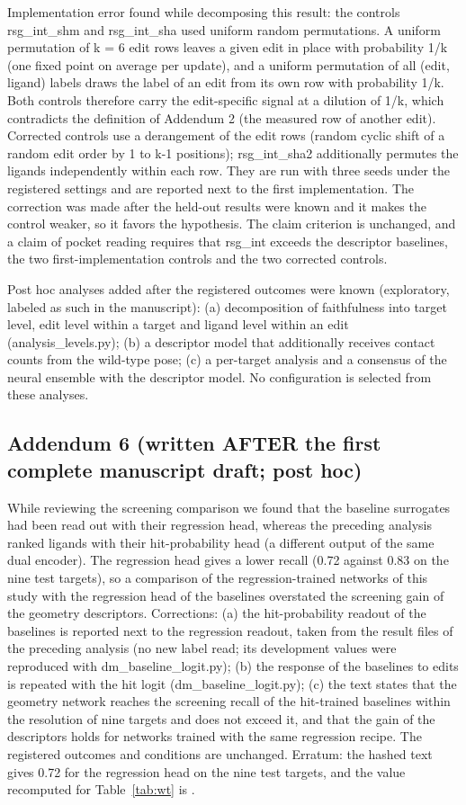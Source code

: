 Implementation error found while decomposing this result: the controls rsg\_int\_shm and rsg\_int\_sha used uniform random permutations. A uniform permutation of k = 6 edit rows leaves a given edit in place with probability 1/k (one fixed point on average per update), and a uniform permutation of all (edit, ligand) labels draws the label of an edit from its own row with probability 1/k. Both controls therefore carry the edit-specific signal at a dilution of 1/k, which contradicts the definition of Addendum 2 (the measured row of another edit). Corrected controls use a derangement of the edit rows (random cyclic shift of a random edit order by 1 to k-1 positions); rsg\_int\_sha2 additionally permutes the ligands independently within each row. They are run with three seeds under the registered settings and are reported next to the first implementation. The correction was made after the held-out results were known and it makes the control weaker, so it favors the hypothesis. The claim criterion is unchanged, and a claim of pocket reading requires that rsg\_int exceeds the descriptor baselines, the two first-implementation controls and the two corrected controls.

Post hoc analyses added after the registered outcomes were known (exploratory, labeled as such in the manuscript): (a) decomposition of faithfulness into target level, edit level within a target and ligand level within an edit (analysis\_levels.py); (b) a descriptor model that additionally receives contact counts from the wild-type pose; (c) a per-target analysis and a consensus of the neural ensemble with the descriptor model. No configuration is selected from these analyses.

\subsection*{Addendum 6 (written AFTER the first complete manuscript draft; post hoc)}

While reviewing the screening comparison we found that the baseline surrogates had been read out with their regression head, whereas the preceding analysis ranked ligands with their hit-probability head (a different output of the same dual encoder). The regression head gives a lower recall (0.72 against 0.83 on the nine test targets), so a comparison of the regression-trained networks of this study with the regression head of the baselines overstated the screening gain of the geometry descriptors. Corrections: (a) the hit-probability readout of the baselines is reported next to the regression readout, taken from the result files of the preceding analysis (no new label read; its development values were reproduced with dm\_baseline\_logit.py); (b) the response of the baselines to edits is repeated with the hit logit (dm\_baseline\_logit.py); (c) the text states that the geometry network reaches the screening recall of the hit-trained baselines within the resolution of nine targets and does not exceed it, and that the gain of the descriptors holds for networks trained with the same regression recipe. The registered outcomes and conditions are unchanged. Erratum: the hashed text gives 0.72 for the regression head on the nine test targets, and the value recomputed for Table~\ref{tab:wt} is \wtRTestCZero{}.

